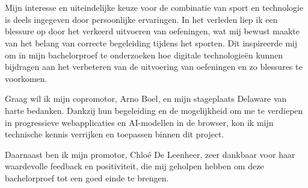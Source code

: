 
\chapter*{}%
\label{ch:voorwoord}


Mijn interesse en uiteindelijke keuze voor de combinatie van sport en technologie is deels ingegeven door persoonlijke ervaringen. 
In het verleden liep ik een blessure op door het verkeerd uitvoeren van oefeningen, wat mij bewust maakte van het belang van correcte begeleiding tijdens het sporten. 
Dit inspireerde mij om in mijn bachelorproef te onderzoeken hoe digitale technologieën kunnen bijdragen aan het verbeteren van de uitvoering van oefeningen en zo blessures te voorkomen.

\medskip

Graag wil ik mijn copromotor, Arno Boel, en mijn stageplaats Delaware van harte bedanken. 
Dankzij hun begeleiding en de mogelijkheid om me te verdiepen in progressieve webapplicaties en AI-modellen in de browser, kon ik mijn technische kennis verrijken en toepassen binnen dit project.

\medskip

Daarnaast ben ik mijn promotor, Chloé De Leenheer, zeer dankbaar voor haar waardevolle feedback en positiviteit, die mij geholpen hebben om deze bachelorproef tot een goed einde te brengen.

